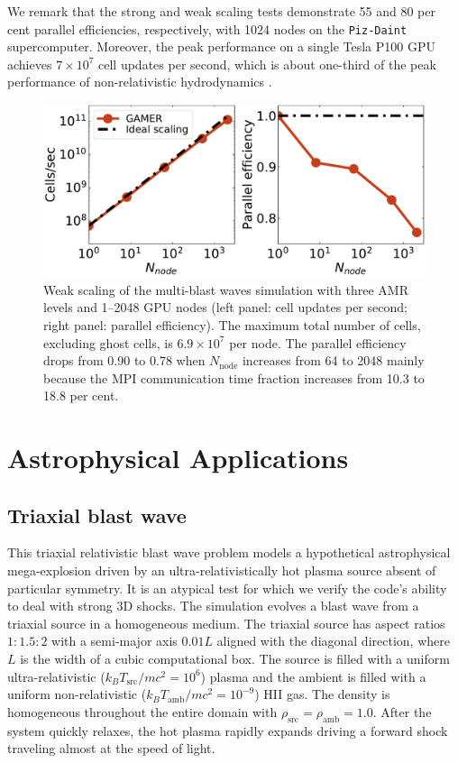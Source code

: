 \documentclass[twocolumn]{aastex63}
\begin{document}
We remark that the strong and weak scaling tests demonstrate 55 and 80 per cent parallel efficiencies, respectively, with 1024 nodes on the \texttt{Piz-Daint} supercomputer. Moreover, the peak performance on a single Tesla P100 GPU achieves $7\times 10^{7}$ cell updates per second, which is about one-third of the peak performance of non-relativistic hydrodynamics \citep{gamer-2}.


\begin{figure}
\includegraphics[width=\columnwidth]{fig__benchmark_weakscaling.pdf}
\caption{Weak scaling of the multi-blast waves simulation with three AMR levels and 1--2048 GPU nodes (left panel: cell updates per second; right panel: parallel efficiency). The maximum total number of cells, excluding ghost cells, is $6.9\times 10^{7}$ per node. The parallel efficiency drops from 0.90 to 0.78 when $N_{\text{node}}$ increases from 64 to 2048 mainly because the MPI communication time fraction increases from 10.3 to 18.8 per cent.}
\label{fig:weak scaling}
\end{figure}




\section{Astrophysical Applications}
\label{Astrophysical Applications}
\subsection{Triaxial blast wave}\label{Ellipsoid blast wave test}
This triaxial relativistic blast wave problem models a hypothetical astrophysical mega-explosion driven by an ultra-relativistically hot plasma source absent of particular symmetry. It is an atypical test for which we verify the code's ability to deal with strong 3D shocks. The simulation evolves a blast wave from a triaxial source in a homogeneous medium. The triaxial source has aspect ratios $1:1.5:2$ with a semi-major axis $0.01L$ aligned with the diagonal direction, where $L$ is the width of a cubic computational box. The source is filled with a uniform ultra-relativistic ($k_{B}T_{\text{src}}/mc^2=10^{6}$) plasma and the ambient is filled with a uniform non-relativistic ($k_{B}T_{\text{amb}}/mc^2=10^{-9}$) HII gas. The density is homogeneous throughout the entire domain with $\rho_{\text{src}}=\rho_{\text{amb}}=1.0$. After the system quickly relaxes, the hot plasma rapidly expands driving a forward shock traveling almost at the speed of light.
\end{document}
